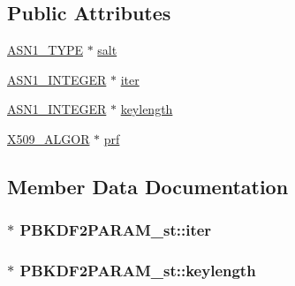 \subsection*{Public Attributes}
\begin{DoxyCompactItemize}
\item 
\hyperlink{asn1_8h_a7895e03d9fee2bc4963faf2a31a9439e}{A\+S\+N1\+\_\+\+T\+Y\+PE} $\ast$ \hyperlink{struct_p_b_k_d_f2_p_a_r_a_m__st_aa81f35e6d5ec790f7265b17be3a6d163}{salt}
\item 
\hyperlink{ossl__typ_8h_af4335399bf9774cb410a5e93de65998b}{A\+S\+N1\+\_\+\+I\+N\+T\+E\+G\+ER} $\ast$ \hyperlink{struct_p_b_k_d_f2_p_a_r_a_m__st_a8ff00adf7617aa97d36fdd4b6fdbaf0f}{iter}
\item 
\hyperlink{ossl__typ_8h_af4335399bf9774cb410a5e93de65998b}{A\+S\+N1\+\_\+\+I\+N\+T\+E\+G\+ER} $\ast$ \hyperlink{struct_p_b_k_d_f2_p_a_r_a_m__st_a0d7609db9885ce6ab331668123b09a2c}{keylength}
\item 
\hyperlink{ossl__typ_8h_aa2b6185e6254f36f709cd6577fb5022e}{X509\+\_\+\+A\+L\+G\+OR} $\ast$ \hyperlink{struct_p_b_k_d_f2_p_a_r_a_m__st_ac2bdfe036b70c95d5b58e61c1b786fc1}{prf}
\end{DoxyCompactItemize}


\subsection{Member Data Documentation}
\subsubsection[{\texorpdfstring{iter}{iter}}]{$\ast$ P\+B\+K\+D\+F2\+P\+A\+R\+A\+M\+\_\+st\+::iter}\hypertarget{struct_p_b_k_d_f2_p_a_r_a_m__st_a8ff00adf7617aa97d36fdd4b6fdbaf0f}{}\label{struct_p_b_k_d_f2_p_a_r_a_m__st_a8ff00adf7617aa97d36fdd4b6fdbaf0f}
\subsubsection[{\texorpdfstring{keylength}{keylength}}]{$\ast$ P\+B\+K\+D\+F2\+P\+A\+R\+A\+M\+\_\+st\+::keylength}\hypertarget{struct_p_b_k_d_f2_p_a_r_a_m__st_a0d7609db9885ce6ab331668123b09a2c}{}\label{struct_p_b_k_d_f2_p_a_r_a_m__st_a0d7609db9885ce6ab331668123b09a2c}
